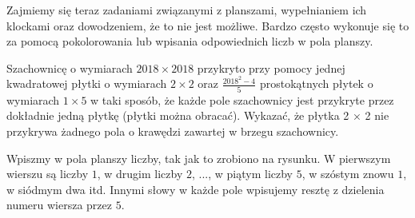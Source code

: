 

\noindent
Zajmiemy się teraz zadaniami związanymi z planszami, wypełnianiem ich klockami oraz dowodzeniem, że to nie jest możliwe. Bardzo często wykonuje się to za pomocą pokolorowania lub wpisania odpowiednich liczb w pola planszy.

\vspace{10px}


\noindent
Szachownicę o wymiarach $2018\times 2018$ przykryto przy pomocy jednej kwadratowej płytki o wymiarach $2 \times 2$ oraz $\frac{2018^2 − 4}{5}$ prostokątnych płytek o wymiarach $1 \times 5$ w taki sposób, że każde pole szachownicy jest przykryte przez dokładnie jedną płytkę (płytki można obracać). Wykazać, że płytka 2 × 2 nie przykrywa żadnego pola o krawędzi zawartej w brzegu szachownicy.

\vspace{5px}


\noindent
Wpiszmy w pola planszy liczby, tak jak to zrobiono na rysunku. W pierwszym wierszu są liczby $1$, w drugim liczby $2$, ..., w piątym liczby $5$, w szóstym znowu $1$, w siódmym dwa itd. Innymi słowy w każde pole wpisujemy resztę z dzielenia numeru wiersza przez $5$.

